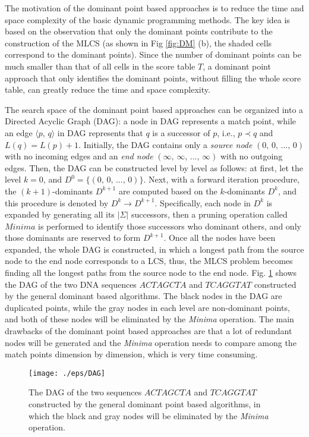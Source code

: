 \documentclass{article}
\begin{document}
The motivation of the dominant point based approaches is to reduce the
time and space complexity of the basic dynamic programming
methods. The key idea is based on the observation that only the
dominant points contribute to the construction of the MLCS (as shown
in Fig \ref{fig:DM} (b), the shaded cells correspond to the dominant
points).  Since the number of dominant points can be much smaller than
that of all cells in the score table $T$, a dominant point approach
that only identifies the dominant points, without filling the whole
score table, can greatly reduce the time and space complexity.

The search space of the dominant point based approaches can be
organized into a Directed Acyclic Graph (DAG): a node in DAG
represents a match point, while an edge $\langle p,\, q \rangle$ in
DAG represents that $q$ is a successor of $p$, i.e., $p \prec q$ and
$L(q) = L(p) + 1$.  Initially, the DAG contains only a \emph{source
  node} $(0,\, 0,\, ...,\, 0)$ with no incoming edges and an \emph{end
  node} $(\infty,\, \infty,\, ...,\, \infty)$ with no outgoing
edges. Then, the DAG can be constructed level by level as follows: at
first, let the level $k = 0$, and $D^0 = \{(0,\, 0,\, ...,\,
0)\}$. Next, with a forward iteration procedure, the $(k+1)$-dominants
$D^{k+1}$ are computed based on the $k$-dominants $D^k$, and this
procedure is denoted by $D^k \rightarrow D^{k+1}$. Specifically, each
node in $D^k$ is expanded by generating all its $|\Sigma|$ successors,
then a pruning operation called $Minima$ is performed to identify
those successors who dominant others, and only those dominants are
reserved to form $D^{k+1}$. Once all the nodes have been expanded, the
whole DAG is constructed, in which a longest path from the source node
to the end node corresponds to a LCS, thus, the MLCS problem becomes
finding all the longest paths from the source node to the end node.
Fig. \ref{fig:DAG} shows the DAG of the two DNA sequences $ACTAGCTA$
and $TCAGGTAT$ constructed by the general dominant based
algorithms. The black nodes in the DAG are duplicated points, while
the gray nodes in each level are non-dominant points, and both of
these nodes will be eliminated by the \emph{Minima} operation. The
main drawbacks of the dominant point based approaches are that a lot
of redundant nodes will be generated and the \emph{Minima} operation
needs to compare among the match points dimension by dimension, which
is very time consuming.


\begin{figure}[htbp]
  \centering
  \texttt{[image: ./eps/DAG]}
  \caption{The DAG of the two sequences $ACTAGCTA$ and $TCAGGTAT$
    constructed by the general dominant point based algorithms, in
    which the black and gray nodes will be eliminated by the
    \emph{Minima} operation.}
  \label{fig:DAG}
\end{figure}
\end{document}
